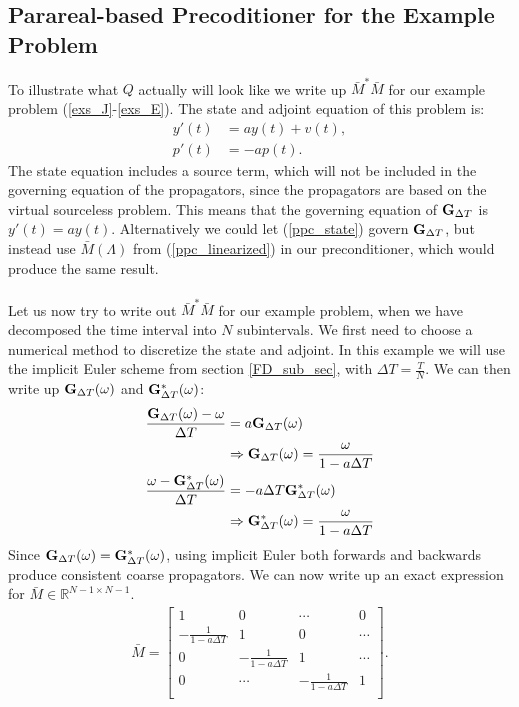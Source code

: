 \subsection{Parareal-based Precoditioner for the Example Problem}
To illustrate what $Q$ actually will look like we write up $\bar M^*\bar M$ for our example problem (\ref{exs_J}-\ref{exs_E}). The state and adjoint equation of this problem is:
\begin{align}
y'(t) &= ay(t) + v(t), \label{ppc_state} \\
p'(t) &= -ap(t). \label{ppc_adjoint}
\end{align}
The state equation includes a source term, which will not be included in the governing equation of the propagators, since the propagators are based on the virtual sourceless problem. This means that the governing equation of $\bold G_{\Delta T}$ is $y'(t) = ay(t)$. Alternatively we could let (\ref{ppc_state}) govern $\bold G_{\Delta T}$, but instead use $\bar M(\Lambda)$ from (\ref{ppc_linearized}) in our preconditioner, which would produce the same result. 
\\
\\
Let us now try to write out $\bar M^*\bar M$ for our example problem, when we have decomposed the time interval into $N$ subintervals. We first need to choose a numerical method to discretize the state and adjoint. In this example we will use the implicit Euler scheme from section \ref{FD_sub_sec}, with $\Delta T=\frac{T}{N}$. We can then write up $\bold G_{\Delta T}(\omega)$ and $\bold G_{\Delta T}^*(\omega)$:
\begin{align}
\frac{\bold G_{\Delta T}(\omega)-\omega}{\Delta T}&=  a\bold G_{\Delta T}(\omega) \\
&\Rightarrow \bold G_{\Delta T}(\omega)= \frac{\omega}{1-a\Delta T} \\
\frac{\omega-\bold G_{\Delta T}^*(\omega)}{\Delta T}&= -a\Delta T \bold G_{\Delta T}^*(\omega) \\
&\Rightarrow \bold G_{\Delta T}^*(\omega)= \frac{\omega}{1-a\Delta T} \label{ImplicitEG}
\end{align}
Since $\bold G_{\Delta T}(\omega)= \bold G_{\Delta T}^*(\omega)$, using implicit Euler both forwards and backwards produce consistent coarse propagators. We can now write up an exact expression for $\bar M\in\mathbb{R}^{N-1\times N-1}$. 
\begin{align*}
\bar M = \left[ \begin{array}{cccc}
   	1 & 0 & \cdots & 0 \\  
   	-\frac{1}{1-a\Delta T} & 1 & 0 & \cdots \\ 
   	0 &-\frac{1}{1-a\Delta T} & 1  & \cdots \\
   	0 &\cdots &-\frac{1}{1-a\Delta T} & 1  \\
  	\end{array}  \right].
\end{align*}
